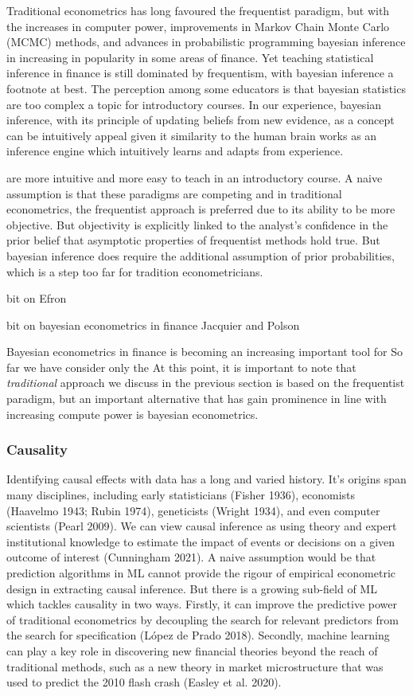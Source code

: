 \documentclass{article}
\begin{document}
Traditional econometrics has long favoured the frequentist paradigm, but
with the increases in computer power, improvements in Markov Chain Monte
Carlo (MCMC) methods, and advances in probabilistic programming bayesian
inference in increasing in popularity in some areas of finance. Yet
teaching statistical inference in finance is still dominated by
frequentism, with bayesian inference a footnote at best. The perception
among some educators is that bayesian statistics are too complex a topic
for introductory courses. In our experience, bayesian inference, with
its principle of updating beliefs from new evidence, as a concept can be
intuitively appeal given it similarity to the human brain works as an
inference engine which intuitively learns and adapts from experience.

are more intuitive and more easy to teach in an introductory course. A
naive assumption is that these paradigms are competing and in
traditional econometrics, the frequentist approach is preferred due to
its ability to be more objective. But objectivity is explicitly linked
to the analyst's confidence in the prior belief that asymptotic
properties of frequentist methods hold true. But bayesian inference does
require the additional assumption of prior probabilities, which is a
step too far for tradition econometricians.

bit on Efron

bit on bayesian econometrics in finance Jacquier and Polson

Bayesian econometrics in finance is becoming an increasing important
tool for So far we have consider only the At this point, it is important
to note that \emph{traditional} approach we discuss in the previous
section is based on the frequentist paradigm, but an important
alternative that has gain prominence in line with increasing compute
power is bayesian econometrics.

\hypertarget{causality}{%
\subsubsection{Causality}\label{causality}}

Identifying causal effects with data has a long and varied history. It's
origins span many disciplines, including early statisticians (Fisher
1936), economists (Haavelmo 1943; Rubin 1974), geneticists (Wright
1934), and even computer scientists (Pearl 2009). We can view causal
inference as using theory and expert institutional knowledge to estimate
the impact of events or decisions on a given outcome of interest
(Cunningham 2021). A naive assumption would be that prediction
algorithms in ML cannot provide the rigour of empirical econometric
design in extracting causal inference. But there is a growing sub-field
of ML which tackles causality in two ways. Firstly, it can improve the
predictive power of traditional econometrics by decoupling the search
for relevant predictors from the search for specification (López de
Prado 2018). Secondly, machine learning can play a key role in
discovering new financial theories beyond the reach of traditional
methods, such as a new theory in market microstructure that was used to
predict the 2010 flash crash (Easley et al. 2020).
\end{document}
